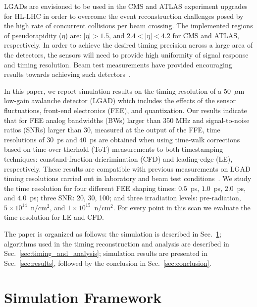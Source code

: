 \documentclass[preprint,1p]{elsarticle}
\begin{document}
LGADs are envisioned to be used in the CMS and ATLAS experiment upgrades for HL-LHC in order to overcome
the event reconstruction challenges posed by the high rate of concurrent
collisions per beam crossing. The implemented regions of pseudorapidity ($\eta$)
are: $|\eta|>1.5$, and $2.4 < |\eta| < 4.2 $ for CMS and ATLAS, respectively. In
order to achieve the desired timing precision across a large area of the
detectors, the sensors will need to provide high uniformity of signal response
and timing resolution. Beam test measurements have provided encouraging results towards achieving
such detectors~\cite{Apresyan:2018oln}.

In this paper, we report simulation results on the
timing resolution of a 50~$\mu$m low-gain avalanche detector (LGAD) which includes
the effects of the sensor fluctuations, front-end electronics (FEE), and quantization.
Our results indicate that for FEE analog bandwidths (BWs) larger than 350 MHz and signal-to-noise ratios
(SNRs) larger than 30, measured at the output of the FFE, time resolutions of $30$~\si{ps} and $40$~\si{ps}
are obtained when using time-walk corrections based on time-over-therhold (ToT)
measurements to both timestamping techniques: constand-fraction-dricrimination (CFD) and leading-edge (LE), respectively. These results are
compatible with previous measurements on LGAD timing resolutions carried out in laboratory and beam test
conditions~\cite{Apresyan:2018oln, Cartiglia201783, PELLEGRINI201412}. We study the time resolution for four
different FEE shaping times: $0.5$~\si{ps}, $1.0$~\si{ps}, $2.0$~\si{ps}, and $4.0$~\si{ps}; three SNR: 20, 30, 100; and three
irradiation levels: pre-radiation, $5\times 10^{14}$~n/cm$^2$, and $1\times 10^{15}$~n/cm$^2$. For every point in this scan we
 evaluate the time resolution for LE and CFD.

The paper is organized as follows: the simulation is described in
Sec.~\ref{sec:simulation}; algorithms used in the timing
reconstruction and analysis are described in Sec.~\ref{sec:timing_and_analysis}; simulation results
are presented in Sec.~\ref{sec:results}, followed by the conclusion in
Sec.~\ref{sec:conclusion}.

\section{Simulation Framework}
\label{sec:simulation}

\end{document}
